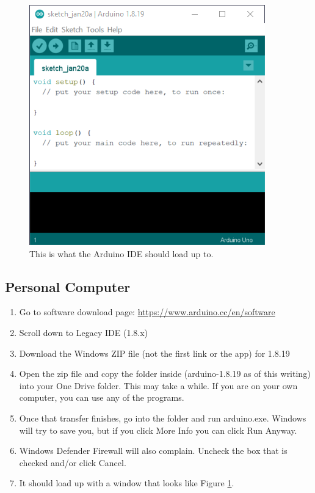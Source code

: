 \begin{figure}[!htb]
	\centering
	\includegraphics[scale=1.0]{arduinoStart/emptysketch.PNG}
	\caption{This is what the Arduino IDE should load up to.}
	\label{fig:emptysketch}
\end{figure} 

\subsection{Personal Computer}
\begin{enumerate}
	\item Go to software download page: \href{https://www.arduino.cc/en/software}{https://www.arduino.cc/en/software}
	\item Scroll down to Legacy IDE (1.8.x)
	\item Download the Windows ZIP file (not the first link or the app) for 1.8.19
	\item Open the zip file and copy the folder inside (arduino-1.8.19 as of this writing) into your One Drive folder. This may take a while. If you are on your own computer, you can use any of the programs.
	\item Once that transfer finishes, go into the folder and run arduino.exe. Windows will try to save you, but if you click More Info you can click Run Anyway.
	\item Windows Defender Firewall will also complain. Uncheck the box that is checked and/or click Cancel.
	\item It should load up with a window that looks like Figure \ref{fig:emptysketch}.
\end{enumerate}

